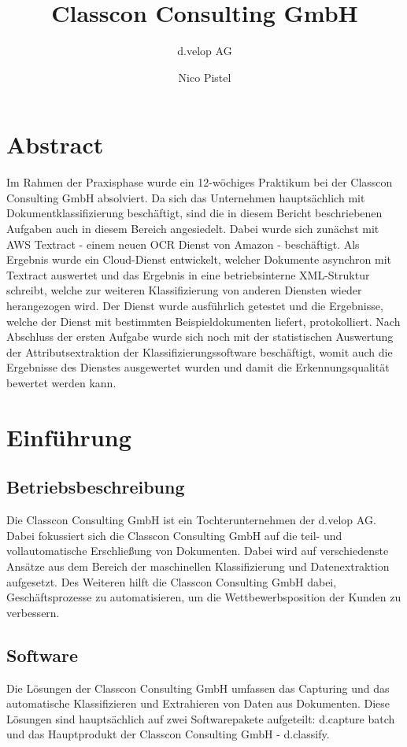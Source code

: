 \documentclass{whswinvcbook}
\title[Bericht]{Classcon Consulting GmbH}
\subtitle{d.velop AG}
\author[Nico Pistel]{Nico Pistel}
\begin{document}
\frontmatter

\maketitle

\cleardoublepage
\chapter*{Abstract}
Im Rahmen der Praxisphase wurde ein 12-wöchiges Praktikum bei der Classcon Consulting GmbH absolviert. Da sich das Unternehmen hauptsächlich mit Dokumentklassifizierung beschäftigt, sind die in diesem Bericht beschriebenen Aufgaben auch in diesem Bereich angesiedelt. Dabei wurde sich zunächst mit AWS Textract - einem neuen OCR Dienst von Amazon - beschäftigt. Als Ergebnis wurde ein Cloud-Dienst entwickelt, welcher Dokumente asynchron mit Textract auswertet und das Ergebnis in eine betriebsinterne XML-Struktur schreibt, welche zur weiteren Klassifizierung von anderen Diensten wieder herangezogen wird. Der Dienst wurde ausführlich getestet und die Ergebnisse, welche der Dienst mit bestimmten Beispieldokumenten liefert, protokolliert. Nach Abschluss der ersten Aufgabe wurde sich noch mit der statistischen Auswertung der Attributsextraktion der Klassifizierungssoftware beschäftigt, womit auch die Ergebnisse des Dienstes ausgewertet wurden und damit die Erkennungsqualität bewertet werden kann.

\tableofs
\lstlistoflistings

\mainmatter

\chapter{Einführung}
\section{Betriebsbeschreibung}
Die Classcon Consulting GmbH ist ein Tochterunternehmen der d.velop AG. Dabei fokussiert sich die Classcon Consulting GmbH auf die teil- und vollautomatische Erschließung von Dokumenten. Dabei wird auf verschiedenste Ansätze aus dem Bereich der maschinellen Klassifizierung und Datenextraktion aufgesetzt. Des Weiteren hilft die Classcon Consulting GmbH dabei, Geschäftsprozesse zu automatisieren, um die Wettbewerbsposition der Kunden zu verbessern.
\section{Software}
Die Lösungen der Classcon Consulting GmbH umfassen das Capturing und das automatische Klassifizieren und Extrahieren von Daten aus Dokumenten. Diese Lösungen sind hauptsächlich auf zwei Softwarepakete aufgeteilt: d.capture batch und das Hauptprodukt der Classcon Consulting GmbH - d.classify.
\end{document}
